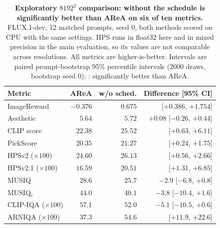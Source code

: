 \begin{table}[t]
\centering\footnotesize
\setlength{\tabcolsep}{4pt}
\caption{\textbf{Exploratory $8192^2$ comparison: \sca{} without the schedule is significantly better than AReA on six of ten metrics.} FLUX.1-dev, 12 matched prompts, seed 0, both methods scored on CPU with the same settings. HPS runs in float32 here and in mixed precision in the main evaluation, so its values are not comparable across resolutions. All metrics are higher-is-better. Intervals are paired prompt-bootstrap 95\% percentile intervals (2000 draws, bootstrap seed 0); : significantly better than AReA.}
\label{tab:e2_8192_per_image}
\begin{tabular}{lrrr}
\toprule
Metric & AReA & \sca{} w/o sched. & Difference [95\% CI] \\
\midrule
ImageReward & $-0.376$ & $0.675$ & \up{$+1.051$} [$+0.386$, $+1.754$] \\
Aesthetic & $5.64$ & $5.72$ & $+0.08$ [$-0.26$, $+0.44$] \\
CLIP score & $22.38$ & $25.52$ & \up{$+3.14$} [$+0.63$, $+6.11$] \\
PickScore & $20.35$ & $21.27$ & \up{$+0.92$} [$+0.24$, $+1.75$] \\
HPSv2 ($\times100$) & $24.60$ & $26.13$ & \up{$+1.53$} [$+0.56$, $+2.66$] \\
HPSv2.1 ($\times100$) & $16.59$ & $20.51$ & \up{$+3.92$} [$+1.31$, $+6.85$] \\
MUSIQ & $28.6$ & $25.7$ & $-2.9$ [$-6.8$, $+0.8$] \\
MUSIQ$_\text{c}$ & $44.0$ & $40.1$ & $-3.8$ [$-10.4$, $+1.6$] \\
CLIP-IQA ($\times100$) & $57.1$ & $52.0$ & $-5.1$ [$-10.5$, $+0.6$] \\
ARNIQA ($\times100$) & $37.3$ & $54.6$ & \up{$+17.3$} [$+11.9$, $+22.6$] \\
\bottomrule
\end{tabular}
\end{table}
